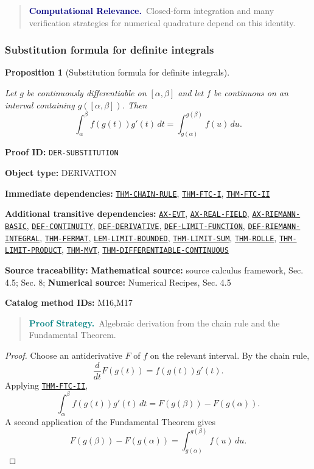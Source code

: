 \documentclass[10pt]{article}
\newcommand{\pidraw}[1]{\begingroup\urlstyle{tt}\nolinkurl{#1}\endgroup}
\newcommand{\pidref}[1]{\hyperref[prf:#1]{\pidraw{#1}}}
\newcommand{\pid}[1]{\pidref{#1}}
\newtheorem{proposition}[theorem]{Proposition}
\theoremstyle{definition}
\theoremstyle{remark}
\newenvironment{proofstrategy}
{\begin{quote}\small\noindent\textbf{\textcolor{teal}{Proof Strategy.}}\ }
{\end{quote}}
\newenvironment{computationalrelevance}
{\begin{quote}\small\noindent\textbf{\textcolor{navy}{Computational Relevance.}}\ }
{\end{quote}}
\newcommand{\meta}[2]{\noindent\textbf{#1:} #2\par}
\begin{document}
\begin{computationalrelevance}Closed-form integration and many verification strategies for numerical quadrature depend on this identity.\end{computationalrelevance}

\subsubsection{Substitution formula for definite integrals}

\begin{proposition}[Substitution formula for definite integrals]\label{prf:DER-SUBSTITUTION}

Let $g$ be continuously differentiable on $[\alpha,\beta]$ and let $f$ be continuous on an interval containing $g([\alpha,\beta])$. Then
\[
\int_\alpha^\beta f(g(t))g'(t)\,dt
=
\int_{g(\alpha)}^{g(\beta)} f(u)\,du.
\]

\end{proposition}

\meta{Proof ID}{\pidraw{DER-SUBSTITUTION}}
\meta{Object type}{DERIVATION}
\meta{Immediate dependencies}{\pidref{THM-CHAIN-RULE}, \pidref{THM-FTC-I}, \pidref{THM-FTC-II}}
\meta{Additional transitive dependencies}{\pidref{AX-EVT}, \pidref{AX-REAL-FIELD}, \pidref{AX-RIEMANN-BASIC}, \pidref{DEF-CONTINUITY}, \pidref{DEF-DERIVATIVE}, \pidref{DEF-LIMIT-FUNCTION}, \pidref{DEF-RIEMANN-INTEGRAL}, \pidref{THM-FERMAT}, \pidref{LEM-LIMIT-BOUNDED}, \pidref{THM-LIMIT-SUM}, \pidref{THM-ROLLE}, \pidref{THM-LIMIT-PRODUCT}, \pidref{THM-MVT}, \pidref{THM-DIFFERENTIABLE-CONTINUOUS}}
\meta{Source traceability}{\textbf{Mathematical source:} source calculus framework, Sec. 4.5; Sec. 8; \textbf{Numerical source:} Numerical Recipes, Sec. 4.5}
\meta{Catalog method IDs}{M16,M17}

\begin{proofstrategy}Algebraic derivation from the chain rule and the Fundamental Theorem.\end{proofstrategy}

\begin{proof}

Choose an antiderivative $F$ of $f$ on the relevant interval. By the chain rule,
\[
\frac{d}{dt}F(g(t))=f(g(t))g'(t).
\]
Applying \pid{THM-FTC-II},
\[
\int_\alpha^\beta f(g(t))g'(t)\,dt
=F(g(\beta))-F(g(\alpha)).
\]
A second application of the Fundamental Theorem gives
\[
F(g(\beta))-F(g(\alpha))
=\int_{g(\alpha)}^{g(\beta)} f(u)\,du.
\]

\end{proof}
\end{document}
